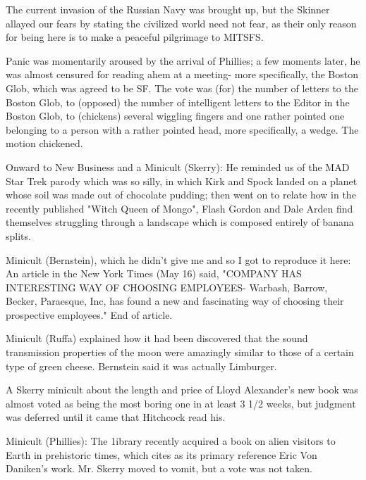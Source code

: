 \documentclass[12pt]{article}
\begin{document}
The current invasion of the Russian Navy was brought up, but the Skinner allayed our fears by stating the civilized world need not fear, as their only reason for being here is to make a peaceful pilgrimage to MITSFS.

Panic was momentarily aroused by the arrival of Phillies; a few moments later, he was almost censured for reading ahem at a meeting- more specifically, the Boston Glob, which was agreed to be SF. The vote was (for) the number of letters to the Boston Glob, to (opposed) the number of intelligent letters to the Editor in the Boston Glob, to (chickens) several wiggling fingers and one rather pointed one belonging to a person with a rather pointed head, more specifically, a wedge. The motion chickened.

Onward to New Business and a Minicult (Skerry): He reminded us of the MAD Star Trek parody which was so silly, in which Kirk and Spock landed on a planet whose soil was made out of chocolate pudding; then went on to relate how in the recently published "Witch Queen of Mongo", Flash Gordon and Dale Arden find themselves struggling through a landscape which is composed entirely of banana splits.

Minicult (Bernstein), which he didn't give me and so I got to reproduce it here: An article in the New York Times (May 16) said, "COMPANY HAS INTERESTING WAY OF CHOOSING EMPLOYEES- Warbash, Barrow, Becker, Paraesque, Inc, has found a new and fascinating way of choosing their prospective employees." End of article.

Minicult (Ruffa) explained how it had been discovered that the sound transmission properties of the moon were amazingly similar to those of a certain type of green cheese. Bernstein said it was actually Limburger.

A Skerry minicult about the length and price of Lloyd Alexander's new book was almost voted as being the most boring one in at least 3 1/2 weeks, but judgment was deferred until it came that Hitchcock read his.

Minicult (Phillies): The 1ibrary recently acquired a book on alien visitors to Earth in prehistoric times, which cites as its primary reference Eric Von Daniken's work. Mr. Skerry moved to vomit, but a vote was not taken.
\end{document}
